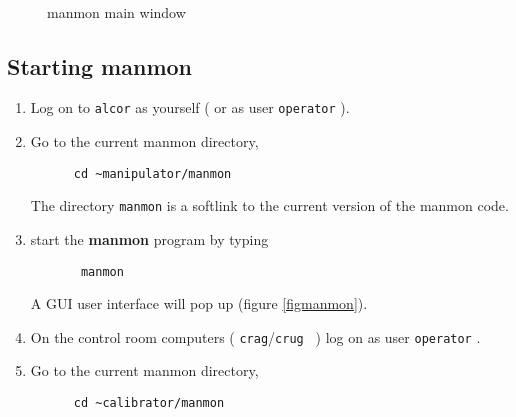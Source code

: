 \begin{figure}[htb]
\begin{center}
\leavevmode
\epsfxsize=5.0in
~\\
\end{center}
\caption[manmon main window] 
        {manmon main window
        }
\end{figure}
  
\subsection{Starting manmon}
\begin{enumerate}
\item Log on to {\tt alcor} as yourself ( or as user {\tt operator} ).

\item Go to the current manmon directory,
  \begin{verbatim}
      cd ~manipulator/manmon
  \end{verbatim}
  The directory {\tt manmon} is a softlink to the current version
  of the manmon code.
  
\item start the {\bf manmon} program by typing
  \begin{verbatim}
       manmon
  \end{verbatim}
  A GUI user interface will pop up (figure \ref{figmanmon}).
  
\item On the control room computers ( {\tt crag}/{\tt crug } ) log on as
user {\tt operator} .

\item Go to the current manmon directory,
\begin{verbatim}
      cd ~calibrator/manmon
\end{verbatim}





\end{enumerate}
